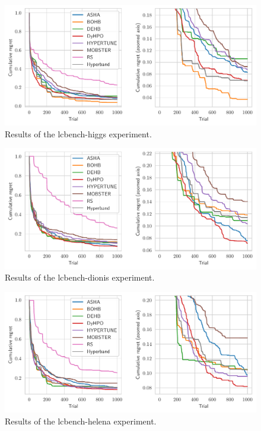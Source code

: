 \begin{figure}[H]
    \centering
    \includegraphics[scale=0.65]{img/tabular_exp/lcbench-higgs_plot.pdf}
    \caption{Results of the lcbench-higgs experiment.}
\end{figure}

\begin{figure}[H]
    \centering
    \includegraphics[scale=0.65]{img/tabular_exp/lcbench-dionis_plot.pdf}
    \caption{Results of the lcbench-dionis experiment.}
\end{figure}

\begin{figure}[H]
    \centering
    \includegraphics[scale=0.65]{img/tabular_exp/lcbench-helena_plot.pdf}
    \caption{Results of the lcbench-helena experiment.}
\end{figure}


